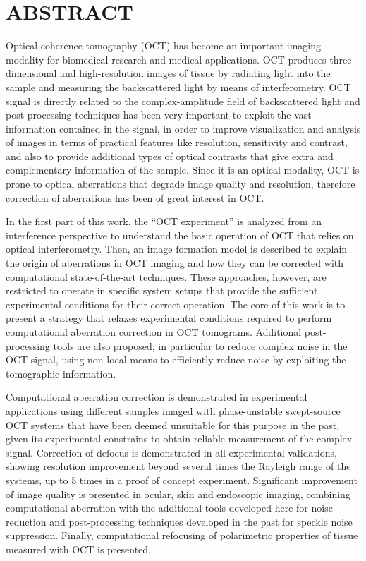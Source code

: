 {}
\chapter*{ABSTRACT}

Optical coherence tomography (OCT) has become an important imaging modality for biomedical research and medical applications. OCT produces three-dimensional and high-resolution images of tissue by radiating light into the sample and measuring the backscattered light by means of interferometry. OCT signal is directly related to the complex-amplitude field of backscattered light and post-processing techniques has been very important to exploit the vast information contained in the signal, in order to improve visualization and analysis of images in terms of practical features like resolution, sensitivity and contrast, and also to provide additional types of optical contrasts that give extra and complementary information of the sample. Since it is an optical modality, OCT is prone to optical aberrations that degrade image quality and resolution, therefore correction of aberrations has been of great interest in OCT.

In the first part of this work, the ``OCT experiment'' is analyzed from an interference perspective to understand the basic operation of OCT that relies on optical interferometry. Then, an image formation model is described to explain the origin of aberrations in OCT imaging and how they can be corrected with computational state-of-the-art techniques. These approaches, however, are restricted to operate in specific system setups that provide the sufficient experimental conditions for their correct operation. The core of this work is to present a strategy that relaxes experimental conditions required to perform computational aberration correction in OCT tomograms. Additional post-processing tools are also proposed, in particular to reduce complex noise in the OCT signal, using non-local means to efficiently reduce noise by exploiting the tomographic information.

Computational aberration correction is demonstrated in experimental applications using different samples imaged with phase-unstable swept-source OCT systems that have been deemed unsuitable for this purpose in the past, given its experimental constrains to obtain reliable measurement of the complex signal. Correction of defocus is demonstrated in all experimental validations, showing resolution improvement beyond several times the Rayleigh range of the systems, up to 5 times in a proof of concept experiment. Significant improvement of image quality is presented in ocular, skin and endoscopic imaging, combining computational aberration with the additional tools developed here for noise reduction and post-processing techniques developed in the past for speckle noise suppression. Finally, computational refocusing of polarimetric properties of tissue measured with OCT is presented.